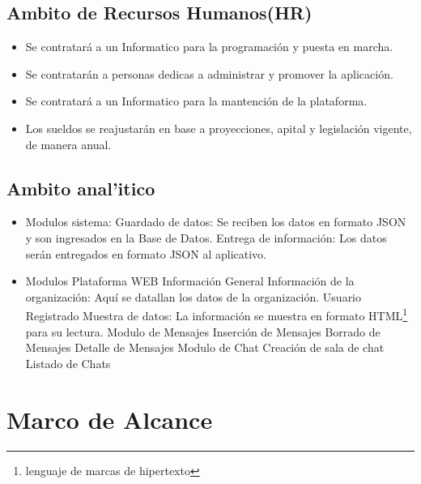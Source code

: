 \documentclass[letterpaper,openright,10pt,oneside]{report}
\begin{document}
					\subsection{Ambito de Recursos Humanos(HR)}
						\begin{itemize}
							\item Se contratará a un Informatico para la programación y puesta en marcha.
							\item Se contratarán a personas dedicas a administrar y promover la aplicación.
							\item Se contratará a un Informatico para la mantención de la plataforma.
							\item Los sueldos se reajustarán en base a proyecciones, apital y legislación vigente, de manera anual.
						\end{itemize}
					\subsection{Ambito anal'itico}
						\begin{itemize}
							\item Modulos sistema:
								\subitem Guardado de datos: Se reciben los datos en formato JSON y son ingresados en la Base de Datos.
								\subitem Entrega de información: Los datos serán entregados en formato JSON al aplicativo.
							\item Modulos Plataforma WEB
								\subitem Información General
									\subsubitem Información de la organización: Aquí se datallan los datos de la organización.
								\subitem Usuario Registrado
									\subsubitem Muestra de datos: La información se muestra en formato HTML\footnote{lenguaje de marcas de hipertexto} para su lectura.
								\subitem Modulo de Mensajes
									\subsubitem Inserción de Mensajes
									\subsubitem Borrado de Mensajes
									\subsubitem Detalle de Mensajes
								\subitem Modulo de Chat
									\subsubitem Creación de sala de chat
									\subsubitem Listado de Chats
						\end{itemize}
				\section{Marco de Alcance}	
\end{document}
